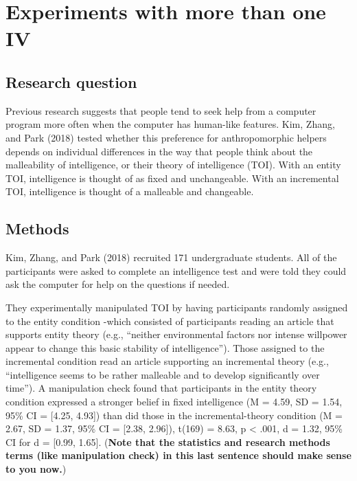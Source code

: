 \documentclass[
]{book}
\begin{document}
\hypertarget{experiments-with-more-than-one-iv}{%
\chapter{Experiments with more than one IV}\label{experiments-with-more-than-one-iv}}

\hypertarget{research-question-3}{%
\section{Research question}\label{research-question-3}}

Previous research suggests that people tend to seek help from a computer program more often when the computer has human-like features. Kim, Zhang, and Park (2018) tested whether this preference for anthropomorphic helpers depends on individual differences in the way that people think about the malleability of intelligence, or their theory of intelligence (TOI). With an entity TOI, intelligence is thought of as fixed and unchangeable. With an incremental TOI, intelligence is thought of a malleable and changeable.

\hypertarget{methods}{%
\section{Methods}\label{methods}}

Kim, Zhang, and Park (2018) recruited 171 undergraduate students. All of the participants were asked to complete an intelligence test and were told they could ask the computer for help on the questions if needed.

They experimentally manipulated TOI by having participants randomly assigned to the entity condition -which consisted of participants reading an article that supports entity theory (e.g., ``neither environmental factors nor intense willpower appear to change this basic stability of intelligence''). Those assigned to the incremental condition read an article supporting an incremental theory (e.g., ``intelligence seems to be rather malleable and to develop significantly over time''). A manipulation check found that participants in the entity theory condition expressed a stronger belief in fixed intelligence (M = 4.59, SD = 1.54, 95\% CI = {[}4.25, 4.93{]}) than did those in the incremental-theory condition (M = 2.67, SD = 1.37, 95\% CI = {[}2.38, 2.96{]}), t(169) = 8.63, p \textless{} .001, d = 1.32, 95\% CI for d = {[}0.99, 1.65{]}. (\textbf{Note that the statistics and research methods terms (like manipulation check) in this last sentence should make sense to you now.})
\end{document}
